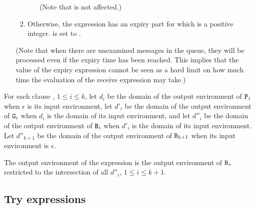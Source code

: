 \begin{itemize}
\begin{enumerate}
\begin{itemize}
(Note that  is not affected.)
\end{itemize}
\item Otherwise, the  expression has an expiry part for which 
is a positive integer.   is set to .
\end{enumerate}
(Note that when there are unexamined messages in the queue,
they will be processed even if the expiry time
has been reached.  This implies that the value of the expiry
expression cannot
be seen as a hard limit on how much time the evaluation of the receive expression
may take.)
\end{itemize}

\ENVIRONMENTS

For each clause , $1\leq
i\leq k$, let $d_i$ be the domain of the output environment of
${\tt{\sl P}}_i$ when $\epsilon$ is its input environment, let $d'_i$ be
the domain of the output environment of ${\tt{\sl G}}_i$ when $d_i$ is the
domain of its input environment, and let $d''_i$ be the domain of the
output environment of ${\tt{\sl B}}_i$ when $d'_i$ is the domain of its
input environment.  Let $d''_{k+1}$ be the domain of the output
environment of ${\tt{\sl B}}_{k+1}$ when its input environment is $\epsilon$.

The output environment of the  expression is
the output environment of ${\tt{\sl B}}_s$ restricted to the
intersection of all $d''_i$, $1\leq i\leq k+1$.

\ifStd
\subsection{Try expressions}

